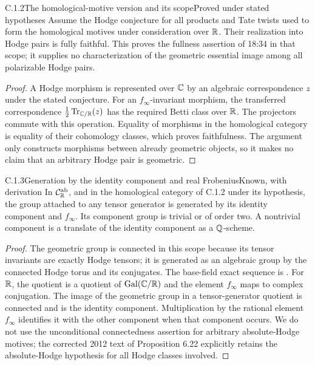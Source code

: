 \begin{result}{C.1.2}{The homological-motive version and its scope}{Proved under stated hypotheses}
Assume the Hodge conjecture for all products and Tate twists used to form the homological motives under consideration over $\mathbb R$. Their realization into Hodge pairs is fully faithful. This proves the fullness assertion of 18:34 in that scope; it supplies no characterization of the geometric essential image among all polarizable Hodge pairs.
\end{result}
\begin{proof}
A Hodge morphism is represented over $\mathbb C$ by an algebraic correspondence $z$ under the stated conjecture. For an $f_\infty$-invariant morphism, the transferred correspondence $\tfrac12\operatorname{Tr}_{\mathbb C/\mathbb R}(z)$ has the required Betti class over $\mathbb R$. The projectors commute with this operation. Equality of morphisms in the homological category is equality of their cohomology classes, which proves faithfulness. The argument only constructs morphisms between already geometric objects, so it makes no claim that an arbitrary Hodge pair is geometric.
\end{proof}

\begin{result}{C.1.3}{Generation by the identity component and real Frobenius}{Known, with derivation}
In $\mathcal C_{\mathbb R}^{\mathrm{ab}}$, and in the homological category of C.1.2 under its hypothesis, the group attached to any tensor generator is generated by its identity component and $f_\infty$. Its component group is trivial or of order two. A nontrivial component is a translate of the identity component as a $\mathbb Q$-scheme.
\end{result}
\begin{proof}
The geometric group is connected in this scope because its tensor invariants are exactly Hodge tensors; it is generated as an algebraic group by the connected Hodge torus and its conjugates. The base-field exact sequence is \cite[Propositions 6.22--6.23 and the abelian-motive discussion following 6.25]{DM1982}. For $\mathbb R$, the quotient is a quotient of $\operatorname{Gal}(\mathbb C/\mathbb R)$ and the element $f_\infty$ maps to complex conjugation. The image of the geometric group in a tensor-generator quotient is connected and is the identity component. Multiplication by the rational element $f_\infty$ identifies it with the other component when that component occurs. We do not use the unconditional connectedness assertion for arbitrary absolute-Hodge motives; the corrected 2012 text of Proposition 6.22 explicitly retains the absolute-Hodge hypothesis for all Hodge classes involved.
\end{proof}

